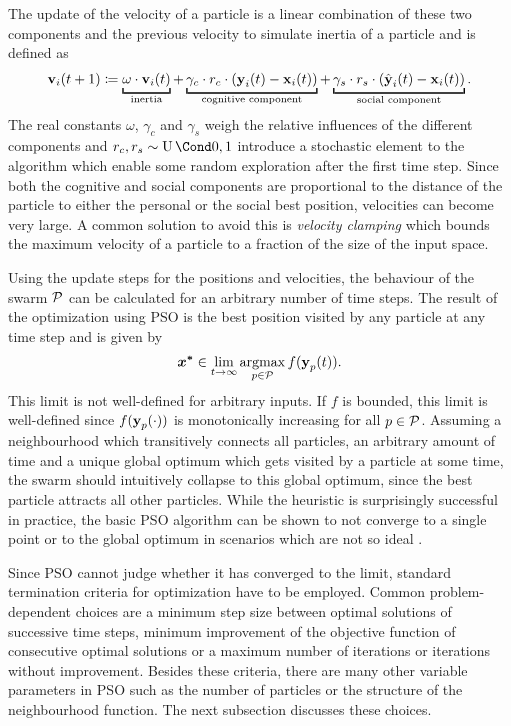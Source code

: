 The update of the velocity of a particle is a linear combination of these two components and the previous velocity to simulate inertia of a particle and is defined as
\begin{align}
    \Vel_i(t+1) \coloneqq
        \underbracket[1pt]{\omega \cdot \Vel_i(t)}_{\text{inertia}}
        + \underbracket[1pt]{\gamma_c \cdot r_c \cdot \left( \Cog_i(t) - \Pos_i(t) \right)}_{\text{cognitive component}}
        + \underbracket[1pt]{\gamma_s \cdot r_s \cdot \left( \Soc_i(t) - \Pos_i(t) \right)}_{\text{social component}}.
\end{align}
The real constants $\omega$, $\gamma_c$ and $\gamma_s$ weigh the relative influences of the different components and $r_c, r_s \sim \Uniform{0, 1}$ introduce a stochastic element to the algorithm which enable some random exploration after the first time step.
Since both the cognitive and social components are proportional to the distance of the particle to either the personal or the social best position, velocities can become very large.
A common solution to avoid this is \emph{velocity clamping} which bounds the maximum velocity of a particle to a fraction of the size of the input space.

Using the update steps for the positions and velocities, the behaviour of the swarm $\operatorname{\mathcal{P}}$ can be calculated for an arbitrary number of time steps.
The result of the optimization using PSO is the best position visited by any particle at any time step and is given by
\begin{align}
    \bm{x^\ast} \in \lim_{t \to \infty} \operatorname*{argmax}_{p \in \operatorname{\mathcal{P}}} f(\operatorname{\mathbf{y}}_p(t)).
\end{align}
This limit is not well-defined for arbitrary inputs.
If $f$ is bounded, this limit is well-defined since $f(\operatorname{\mathbf{y}}_p(\cdot))$ is monotonically increasing for all $p \in \operatorname{\mathcal{P}}$.
Assuming a neighbourhood which transitively connects all particles, an arbitrary amount of time and a unique global optimum which gets visited by a particle at some time, the swarm should intuitively collapse to this global optimum, since the best particle attracts all other particles.
While the heuristic is surprisingly successful in practice, the basic PSO algorithm can be shown to not converge to a single point or to the global optimum in scenarios which are not so ideal \cite{engelbrecht_fundamentals_2006}.

Since PSO cannot judge whether it has converged to the limit, standard termination criteria for optimization have to be employed.
Common problem-dependent choices are a minimum step size between optimal solutions of successive time steps, minimum improvement of the objective function of consecutive optimal solutions or a maximum number of iterations or iterations without improvement.
Besides these criteria, there are many other variable parameters in PSO such as the number of particles or the structure of the neighbourhood function.
The next subsection discusses these choices.

